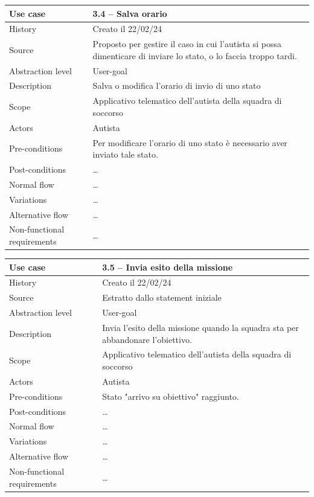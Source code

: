 \documentclass{article}
\begin{document}
    \begin{table}
        \begin{tabularx}{\textwidth}{l|X}
            Use case & \textbf{3.4 – Salva orario}\\
            \hline
            History & Creato il 22/02/24\\
            Source & Proposto per gestire il caso in cui l'autista si possa dimenticare di inviare lo stato, o lo faccia troppo tardi.\\
            Abstraction level & User-goal \\
            Description & Salva o modifica l'orario di invio di uno stato\\
            Scope & Applicativo telematico dell'autista della squadra di soccorso\\
            Actors & Autista\\
            Pre-conditions & Per modificare l'orario di uno stato è necessario aver inviato tale stato.\\
            Post-conditions & \dots \\
            Normal flow & \dots\\
            Variations & \dots \\
            Alternative flow & \dots \\
            Non-functional requirements & \dots
        \end{tabularx}
        \label{tab:usecase3.4}
    \end{table}

    \begin{table}
        \begin{tabularx}{\textwidth}{l|X}
            Use case & \textbf{3.5 – Invia esito della missione}\\
            \hline
            History & Creato il 22/02/24\\
            Source & Estratto dallo statement iniziale\\
            Abstraction level & User-goal\\
            Description & Invia l'esito della missione quando la squadra sta per abbandonare l'obiettivo.\\
            Scope & Applicativo telematico dell'autista della squadra di soccorso\\
            Actors & Autista\\
            Pre-conditions & Stato "arrivo su obiettivo" raggiunto. \\
            Post-conditions & \dots \\
            Normal flow & \dots\\
            Variations & \dots \\
            Alternative flow & \dots \\
            Non-functional requirements & \dots
        \end{tabularx}
        \label{tab:usecase3.5}
    \end{table}
\end{document}
